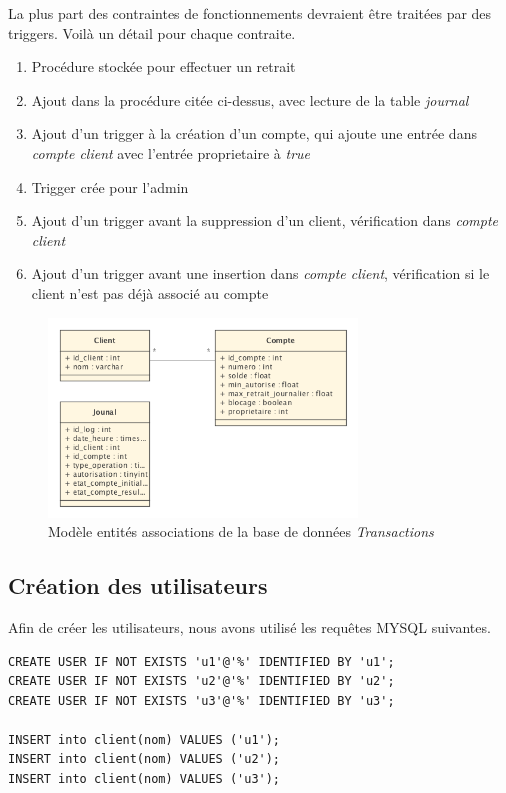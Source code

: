 \documentclass[paper=a4, fontsize=11pt]{scrartcl} %
\numberwithin{equation}{section} %
\numberwithin{figure}{section} %
\numberwithin{table}{section} %
\begin{document}
La plus part des contraintes de fonctionnements devraient être traitées par des triggers. Voilà un détail pour chaque contraite.

\begin{enumerate}
	\item Procédure stockée pour effectuer un retrait
	\item Ajout dans la procédure citée ci-dessus, avec lecture de la table \textit{journal}
	\item Ajout d'un trigger à la création d'un compte, qui ajoute une entrée dans \textit{compte client} avec l'entrée proprietaire à \textit{true}
	\item Trigger crée pour l'admin
	\item Ajout d'un trigger avant la suppression d'un client, vérification dans \textit{compte client}
	\item Ajout d'un trigger avant une insertion dans \textit{compte client}, vérification si le client n'est pas déjà associé au compte
\end{enumerate}

\begin{figure}[h!]
  \centering
  \includegraphics[height=200px]{entites.png}
  \caption{Modèle entités associations de la base de données \textit{Transactions}}
  \label{fig:entites}
\end{figure}


\subsection{Création des utilisateurs}

Afin de créer les utilisateurs, nous avons utilisé les requêtes MYSQL suivantes. 
\begin{lstlisting}
CREATE USER IF NOT EXISTS 'u1'@'%' IDENTIFIED BY 'u1';
CREATE USER IF NOT EXISTS 'u2'@'%' IDENTIFIED BY 'u2';
CREATE USER IF NOT EXISTS 'u3'@'%' IDENTIFIED BY 'u3';

INSERT into client(nom) VALUES ('u1');
INSERT into client(nom) VALUES ('u2');
INSERT into client(nom) VALUES ('u3');
\end{lstlisting}
\end{document}
